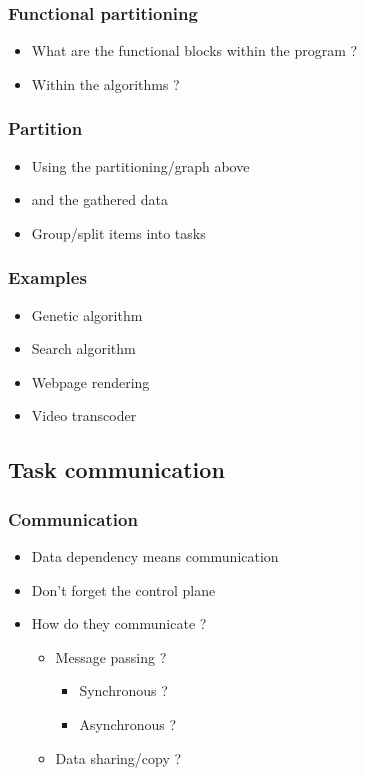 \begin{frame}
  \frametitle{Functional partitioning}

  \begin{itemize}
  \item What are the functional blocks within the program ?
  \item Within the algorithms ?
  \end{itemize}
\end{frame}

\begin{frame}
  \frametitle{Partition}

  \begin{itemize}
  \item Using the partitioning/graph above
  \item and the gathered data
  \item Group/split items into tasks
  \end{itemize}
\end{frame}

\begin{frame}[label=parexamples]
  \frametitle{Examples}
  \begin{itemize}
  \item Genetic algorithm
  \item Search algorithm
  \item Webpage rendering
  \item Video transcoder
  \end{itemize}
\end{frame}




\subsection{Task communication}
\label{subsec:com}

\begin{frame}
  \frametitle{Communication}
  \begin{itemize}
  \item Data dependency means communication
  \item Don't forget the control plane
  \item How do they communicate ?
    \begin{itemize}
    \item Message passing ?
      \begin{itemize}
      \item Synchronous ?
      \item Asynchronous ?
      \end{itemize}
    \item Data sharing/copy ?
    \end{itemize}
  \end{itemize}
\end{frame}


